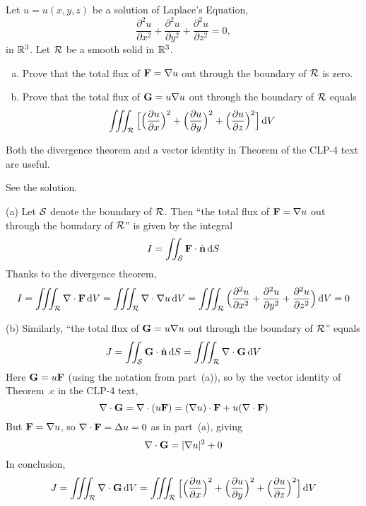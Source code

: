 \begin{solution}
\end{solution}

\begin{question}[M317 2000D] %
Let $u=u(x,y,z)$ be a solution of Laplace's Equation,
$$
\frac{\partial^2 u}{\partial x^2} +\frac{\partial^2 u}{\partial y^2} +\frac{\partial^2 u}{\partial z^2}
= 0,
$$
in $\mathbb{R}^3$. Let $\mathcal{R}$ be a smooth solid in $\mathbb{R}^3$.

\begin{enumerate}[(a)]
\item
Prove that the total flux of $\mathbf{F} = \nabla u$ out through the
boundary of $\mathcal{R}$ is zero.

\item
Prove that the total flux of $\mathbf{G} = u\nabla u$ out through
the boundary of $\mathcal{R}$ equals
$$
\iiint_{\mathcal{R}} \Big[\Big(\frac{\partial u}{\partial x}\Big)^2 + 
\Big(\frac{\partial u}{\partial y}\Big)^2 + 
\Big(\frac{\partial u}{\partial z}\Big)^2\Big]\,\mathrm{d}V
$$
\end{enumerate}

\end{question}

\begin{hint} 
Both the divergence theorem and a vector identity in
Theorem  of the CLP-4 text 
are useful.
\end{hint}

\begin{answer} 
See the solution.
\end{answer}

\begin{solution} 
(a)
Let $\mathcal{S}$ denote the boundary of $\mathcal{R}$.
Then ``the total flux of $\mathbf{F} = \nabla u$ out through the
boundary of $\mathcal{R}$''
is given by the integral
$$
I = \iint_{\mathcal{S}} \mathbf{F}\cdot \hat{\mathbf{n}}\,\mathrm{d}S
$$
Thanks to the divergence theorem,
$$
I
= \iiint_{\mathcal{R}} \nabla\cdot\mathbf{F}\,\mathrm{d}V
= \iiint_{\mathcal{R}} \nabla\cdot\nabla u\,\mathrm{d}V
= \iiint_{\mathcal{R}} \Big(\frac{\partial^2 u}{\partial x^2} 
     +\frac{\partial^2 u}{\partial y^2} 
     +\frac{\partial^2 u}{\partial z^2}\Big)\,\mathrm{d}V
= 0
$$

(b)
Similarly,
``the total flux of $\mathbf{G} = u\nabla u$ out through the boundary of $\mathcal{R}$''
equals
$$
J
= \iint_{\mathcal{S}} \mathbf{G}\cdot \hat{\mathbf{n}}\,\mathrm{d}S
= \iiint_{\mathcal{R}} \nabla\cdot\mathbf{G}\,\mathrm{d}V
$$
Here $\mathbf{G} = u\mathbf{F}$ (using the notation from part~(a)), so by the vector
identity of Theorem .c in the CLP-4 text,
$$
\nabla\cdot\mathbf{G}
= \nabla\cdot(u\mathbf{F})
= (\nabla u)\cdot\mathbf{F} + u(\nabla\cdot\mathbf{F})
$$
But $\mathbf{F} = \nabla u$, so $\nabla\cdot\mathbf{F}=\Delta u=0$ as in part~(a), giving
$$
\nabla\cdot\mathbf{G} = |\nabla u|^2 + 0
$$
In conclusion,
$$
J
= \iiint_{\mathcal{R}} \nabla\cdot\mathbf{G}\,\mathrm{d}V
= \iiint_{\mathcal{R}} \Big[ \Big(\frac{\partial u}{ \partial x}\Big)^2 
   + \Big(\frac{\partial u}{\partial y}\Big)^2 
   + \Big(\frac{\partial u}{\partial z}\Big)^2\Big]\,\mathrm{d}V
$$
\end{solution}

